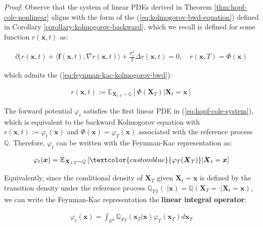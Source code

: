 \documentclass{article}
\newcommand{\bluetext}[1]{\textcolor{customblue}{#1}}
\begin{document}
\textit{Proof.} Observe that the system of linear PDEs derived in Theorem \ref{thm:hopf-cole-nonlinear} aligns with the form of the (\ref{eq:kolmogorov-bwd-equation}) defined in Corollary \ref{corollary:kolmogorov-backward}, which we recall is defined for some function $r(\boldsymbol{x},t)$ as:
\begin{small}
\begin{align}
    \partial_t r(\boldsymbol{x},t)+\langle\boldsymbol{f}(\boldsymbol{x},t), \nabla r(\boldsymbol{x},t)\rangle+\frac{\sigma_t^2}{2}\Delta r(\boldsymbol{x},t)=0, \quad r(\boldsymbol{x},T)=\Phi(\boldsymbol{x})\tag{Kolmogorov Backward Equation}
\end{align}
\end{small}
which admits the (\ref{eq:feynman-kac-kolmogorov-bwd}):
\begin{small}
\begin{align}
r(\boldsymbol{x},t):=\mathbb{E}_{\boldsymbol{X}_{t:T}\sim \mathbb{Q}}\left[\Phi(\boldsymbol{X}_T)|\boldsymbol{X}_t=\boldsymbol{x}\right]\tag{Feynman-Kac Representation}
\end{align}
\end{small}
The forward potential $\varphi_t$ satisfies the first linear PDE in (\ref{eq:hopf-cole-system}), which is equivalent to the backward Kolmogorov equation with $r(\boldsymbol{x},t):=\varphi_t(\boldsymbol{x})$ and $\Phi(\boldsymbol{x})=\varphi_T(\boldsymbol{x})$ associated with the reference process $\mathbb{Q}$. Therefore, $\varphi_t$ can be written with the Feynman-Kac representation as:
\begin{small}
\begin{align}
\varphi_t(\boldsymbol{x})=\mathbb{E}_{\boldsymbol{X}_{t:T}\sim \mathbb{Q}}\left[\bluetext{\varphi_T(\boldsymbol{X}_T)}|\boldsymbol{X}_t=\boldsymbol{x}\right]
\end{align}
\end{small}
Equivalently, since the conditional density of $\boldsymbol{X}_T$ given $\boldsymbol{X}_t =\boldsymbol{x}$ is defined by the transition density under the reference process $\mathbb{Q}_{T|t}(\cdot|\boldsymbol{x})=\mathbb{Q}(\boldsymbol{X}_T=\cdot|\boldsymbol{X}_t=\boldsymbol{x})$, we can write the Feynman-Kac representation the \textbf{linear integral operator}:
\begin{small}
\begin{align}
\boxed{\varphi_t(\boldsymbol{x})=\int_{\mathbb{R}^d}\mathbb{Q}_{T|t}(\boldsymbol{x}_T|\boldsymbol{x})\varphi_T(\boldsymbol{x}_T) d\boldsymbol{x}_T}\tag{Forward Potential}\label{eq:forward-potential-integral}
\end{align}
\end{small}
\end{document}
